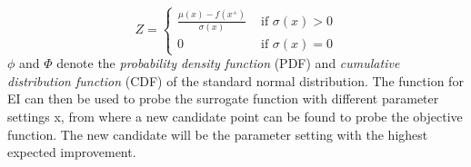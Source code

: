 \begin{equation}
\label{eq:expect-z}
Z =
\begin{cases}
\frac{\mu(x) - f(x^+)}{\sigma(x)} & \text{ if } \sigma(x) > 0\\
0 								  & \text{ if } \sigma(x) = 0
\end{cases}
\end{equation}
$\phi$ and $\Phi$ denote the \emph{probability density function} (PDF) and \emph{cumulative distribution function} (CDF) of the standard normal distribution.
The function for EI can then be used to probe the surrogate function with different parameter settings x, from where a new candidate point can be found to probe the objective function. The new candidate will be the parameter setting with the highest expected improvement.  


